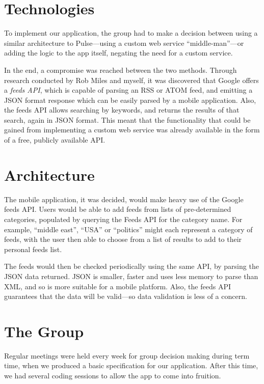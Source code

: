 \documentclass[a4paper,11pt]{article}
\begin{document}
    \section{Technologies}

    To implement our application, the group had to make a decision between
    using a similar architecture to Pulse---using a custom web service
    ``middle-man''---or adding the logic to the app itself, negating the need
    for a custom service.

    In the end, a compromise was reached between the two methods. Through
    research conducted by Rob Miles and myself, it was discovered that Google
    offers a \emph{feeds API}, which is capable of parsing an RSS or ATOM feed,
    and emitting a JSON format response which can be easily parsed by a mobile
    application. Also, the feeds API allows searching by keywords, and returns
    the results of that search, again in JSON format. This meant that the
    functionality that could be gained from implementing a custom web service
    was already available in the form of a free, publicly available API.

    \section{Architecture}

    The mobile application, it was decided, would make heavy use of the Google
    feeds API. Users would be able to add feeds from lists of pre-determined
    categories, populated by querying the Feeds API for the category name. For
    example, ``middle east'', ``USA'' or ``politics'' might each represent
    a category of feeds, with the user then able to choose from a list of
    results to add to their personal feeds list.
    
    The feeds would then be checked periodically using the same API, by parsing
    the JSON data returned. JSON is smaller, faster and uses less memory to
    parse than XML, and so is more suitable for a mobile platform.  Also, the
    feeds API guarantees that the data will be valid---so data validation is
    less of a concern.

    \section{The Group}

    Regular meetings were held every week for group decision making during term
    time, when we produced a basic specification for our application. After
    this time, we had several coding sessions to allow the app to come into
    fruition.
    
\end{document}
